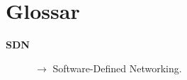 \chapter{Glossar}




\begin{description}

\item[\bf{SDN}] $\rightarrow$ Software-Defined Networking.

\end{description}



